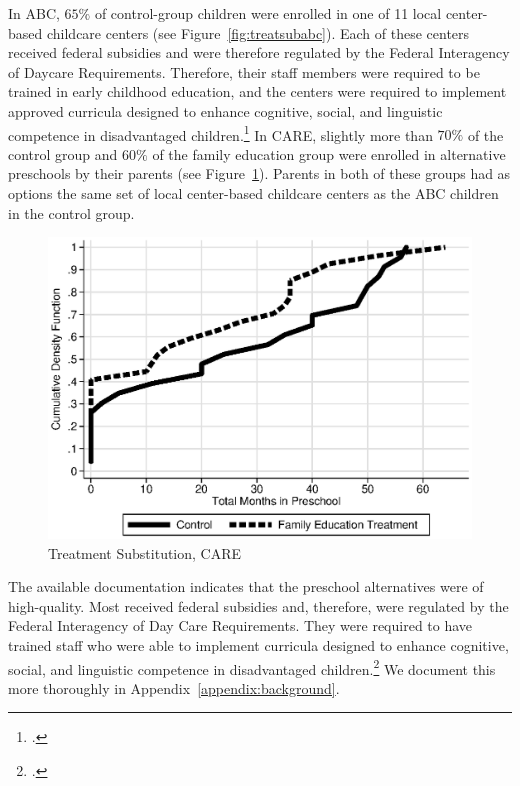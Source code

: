 \noindent In ABC, $65\%$ of control-group children were enrolled in one of 11 local center-based childcare centers (see Figure~\ref{fig:treatsubabc}). Each of these centers received federal subsidies and were therefore regulated by the Federal Interagency of Daycare Requirements. Therefore, their staff members were required to be trained in early childhood education, and the centers were required to implement approved curricula designed to enhance cognitive, social, and linguistic competence in disadvantaged children.\footnote{\citet{Burchinal_etal_1989_CD_Daycare-Pre-K-Dev}.} In CARE, slightly more than $70\%$ of the control group and $60\%$ of the family education group were enrolled in alternative preschools by their parents (see Figure~\ref{fig:treatsubcare}). Parents in both of these groups had as options the same set of local center-based childcare centers as the ABC children in the control group.

\begin{figure}[H]
		\caption{Treatment Substitution, CARE} \label{fig:treatsubcare}
		\includegraphics[width=.9\columnwidth]{output/care_controlcontamination_months.eps}
\end{figure}

\noindent The available documentation indicates that the preschool alternatives were of high-quality. Most received federal subsidies and, therefore, were regulated by the Federal Interagency of Day Care Requirements. They were required to have trained staff who were able to implement curricula designed to enhance cognitive, social, and linguistic competence in disadvantaged children.\footnote{\citet{Burchinal_etal_1989_CD_Daycare-Pre-K-Dev}.} We document this more thoroughly in Appendix~\ref{appendix:background}.

